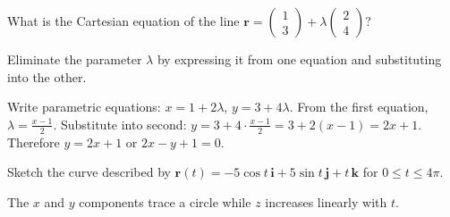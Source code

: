 \begin{problem}
What is the Cartesian equation of the line $\mathbf{r} = \begin{pmatrix} 1 \\ 3 \end{pmatrix} + \lambda \begin{pmatrix} 2 \\ 4 \end{pmatrix}$?
\end{problem}

\begin{hint}
Eliminate the parameter $\lambda$ by expressing it from one equation and substituting into the other.
\end{hint}

\begin{solution}[Sketch]
Write parametric equations: $x = 1 + 2\lambda$, $y = 3 + 4\lambda$. From the first equation, $\lambda = \frac{x-1}{2}$. Substitute into second: $y = 3 + 4 \cdot \frac{x-1}{2} = 3 + 2(x-1) = 2x + 1$. Therefore $y = 2x + 1$ or $2x - y + 1 = 0$.
\end{solution}

\vspace{1em}

\begin{problem}
Sketch the curve described by $\mathbf{r}(t) = -5\cos t\,\mathbf{i} + 5\sin t\,\mathbf{j} + t\,\mathbf{k}$ for $0 \le t \le 4\pi$.
\end{problem}

\begin{hint}
The $x$ and $y$ components trace a circle while $z$ increases linearly with $t$.
\end{hint}

